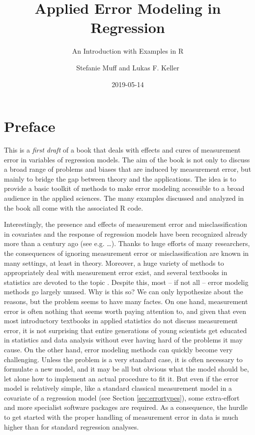\documentclass[]{book}
\title{Applied Error Modeling in Regression}
\subtitle{An Introduction with Examples in R}
\author{Stefanie Muff and Lukas F. Keller}
\date{2019-05-14}
\theoremstyle{definition}
\theoremstyle{definition}
\theoremstyle{definition}
\theoremstyle{remark}
\begin{document}
\maketitle

{
\setcounter{tocdepth}{1}
\tableofcontents
}
\chapter*{Preface}\label{preface}

This is a \emph{first draft} of a book that deals with effects and cures
of measurement error in variables of regression models. The aim of the
book is not only to discuss a broad range of problems and biases that
are induced by measurement error, but mainly to bridge the gap between
theory and the applications. The idea is to provide a basic toolkit of
methods to make error modeling accessible to a broad audience in the
applied sciences. The many examples discussed and analyzed in the book
all come with the associated R code.

Interestingly, the presence and effects of measurement error and
misclassification in covariates and the response of regression models
have been recognized already more than a century ago (see e.g.
\ldots{}). Thanks to huge efforts of many researchers, the consequences
of ignoring measurement error or misclassification are known in many
settings, at least in theory. Moreover, a huge variety of methods to
appropriately deal with measurement error exist, and several textbooks
in statistics are devoted to the topic
\citep{fuller1987, gustafson2004, carroll.etal2006, yi2017}. Despite
this, most -- if not all -- error modelig methods go largely unused. Why
is this so? We can only hypothesize about the reasons, but the problem
seems to have many factes. On one hand, measurement error is often
nothing that seems worth paying attention to, and given that even most
introductory textbooks in applied statistics do not discuss measurement
error, it is not surprising that entire generations of young scientists
get educated in statistics and data analysis without ever having hard of
the problems it may cause. On the other hand, error modeling methods can
quickly become very challenging. Unless the problem is a very standard
case, it is often necessary to formulate a new model, and it may be all
but obvious what the model should be, let alone how to implement an
actual procedure to fit it. But even if the error model is relatively
simple, like a standard classical measurement model in a covariate of a
regression model (see Section \ref{sec:errortypes}), some extra-effort
and more specialist software packages are required. As a consequence,
the hurdle to get started with the proper handling of measurement error
in data is much higher than for standard regression analyses.
\end{document}
